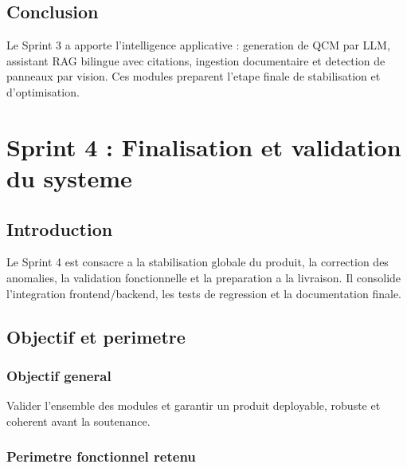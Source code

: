 \documentclass[a4paper,12pt]{report}
\begin{document}
\section*{Conclusion}

Le Sprint 3 a apporte l'intelligence applicative : generation de QCM par LLM,
assistant RAG bilingue avec citations, ingestion documentaire et detection de
panneaux par vision. Ces modules preparent l'etape finale de stabilisation et
d'optimisation.

\clearpage

\chapter{Sprint 4 : Finalisation et validation du systeme}
\minitoc
\newpage

\section*{Introduction}

Le Sprint 4 est consacre a la stabilisation globale du produit, la correction
des anomalies, la validation fonctionnelle et la preparation a la livraison.
Il consolide l'integration frontend/backend, les tests de regression et la
documentation finale.

\section{Objectif et perimetre}

\subsection{Objectif general}

Valider l'ensemble des modules et garantir un produit deployable, robuste et
coherent avant la soutenance.

\subsection{Perimetre fonctionnel retenu}
\end{document}

